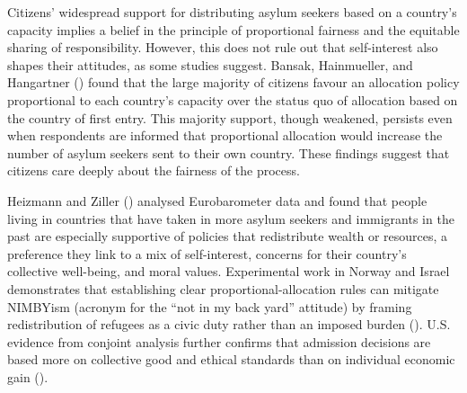 \documentclass[
  12pt,
  a4paper,
]{article}
\begin{document}
Citizens' widespread support for distributing asylum seekers based on a country's capacity implies a belief in the principle of proportional fairness and the equitable sharing of responsibility. However, this does not rule out that self-interest also shapes their attitudes, as some studies suggest. Bansak, Hainmueller, and Hangartner () found that the large majority of citizens favour an allocation policy proportional to each country's capacity over the status quo of allocation based on the country of first entry. This majority support, though weakened, persists even when respondents are informed that proportional allocation would increase the number of asylum seekers sent to their own country. These findings suggest that citizens care deeply about the fairness of the process.

Heizmann and Ziller () analysed Eurobarometer data and found that people living in countries that have taken in more asylum seekers and immigrants in the past are especially supportive of policies that redistribute wealth or resources, a preference they link to a mix of self-interest, concerns for their country's collective well-being, and moral values. Experimental work in Norway and Israel demonstrates that establishing clear proportional-allocation rules can mitigate NIMBYism (acronym for the ``not in my back yard'' attitude) by framing redistribution of refugees as a civic duty rather than an imposed burden (). U.S. evidence from conjoint analysis further confirms that admission decisions are based more on collective good and ethical standards than on individual economic gain ().
\end{document}
